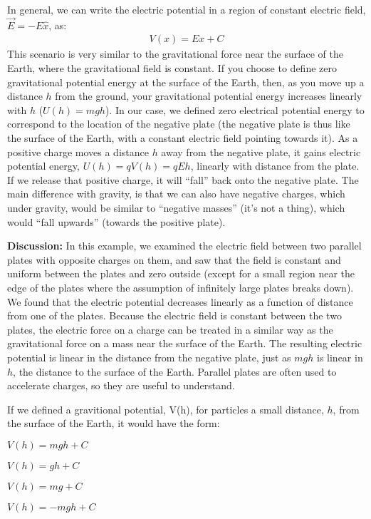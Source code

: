 \begin{example}
In general, we can write the electric potential in a region of constant electric field, $\vec E=-E\hat x$, as:
\begin{align*}
V(x)=Ex + C
\end{align*} 
This scenario is very similar to the gravitational force near the surface of the Earth, where the gravitational field is constant. If you choose to define zero gravitational potential energy at the surface of the Earth, then, as you move up a distance $h$ from the ground, your gravitational potential energy increases linearly with $h$ ($U(h)=mgh$). In our case, we defined zero electrical potential energy to correspond to the location of the negative plate (the negative plate is thus like the surface of the Earth, with a constant electric field pointing towards it). As a positive charge moves a distance $h$ away from the negative plate, it gains electric potential energy, $U(h)=qV(h)=qEh$, linearly with distance from the plate. If we release that positive charge, it will ``fall'' back onto the negative plate. The main difference with gravity, is that we can also have negative charges, which under gravity, would be similar to ``negative masses'' (it's not a thing), which would ``fall upwards'' (towards the positive plate).  

\textbf{Discussion:} In this example, we examined the electric field between two parallel plates with opposite charges on them, and saw that the field is constant and uniform between the plates and zero outside (except for a small region near the edge of the plates where the assumption of infinitely large plates breaks down). We found that the electric potential decreases linearly as a function of distance from one of the plates. Because the electric field is constant between the two plates, the electric force on a charge can be treated in a similar way as the gravitational force on a mass near the surface of the Earth. The resulting electric potential is linear in the distance from the negative plate, just as $mgh$ is linear in $h$, the distance to the surface of the Earth. Parallel plates are often used to accelerate charges, so they are useful to understand. 
\end{example}

%
\begin{checkpoint}
	\begin{MCquestion}{If we defined a gravitional potential, V(h), for particles a small distance, $h$, from the surface of the Earth, it would have the form:}
		\item $V(h) = mgh + C$
		\item $V(h) = gh + C$ \correct
		\item $V(h) = mg + C$
		\item $V(h) = -mgh + C$
	\end{MCquestion}
\end{checkpoint}


